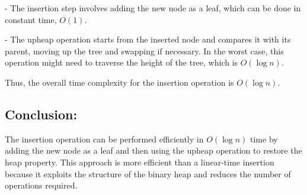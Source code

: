 \documentclass{article}
\begin{document}
-  The insertion step involves adding the new node as a leaf, which can be done in constant time, \( O(1) \).

-  The upheap operation starts from the inserted node and compares it with its parent, moving up the tree and swapping if necessary. In the worst case, this operation might need to traverse the height of the tree, which is \( O(\log n) \).

Thus, the overall time complexity for the insertion operation is \( O(\log n) \).

\subsection*{Conclusion:}

The insertion operation can be performed efficiently in \( O(\log n) \) time by adding the new node as a leaf and then using the upheap operation to restore the heap property. This approach is more efficient than a linear-time insertion because it exploits the structure of the binary heap and reduces the number of operations required.
\end{document}
